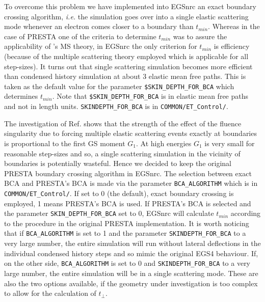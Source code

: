 To overcome this problem we have implemented into EGSnrc an 
exact boundary crossing algorithm, {\em i.e.} the simulation 
goes over into a single elastic scattering mode whenever 
an electron comes closer to a 
boundary than $t_{min}$. 
Whereas in the case of PRESTA one of 
the criteria to determine $t_{min}$ was to assure the 
applicability of \Mol's MS theory, in EGSnrc the only criterion 
for $t_{min}$ is efficiency (because of the multiple scattering theory 
employed which is applicable for all step-sizes). It turns out that single 
scattering simulation becomes more efficient than condensed history
simulation at about 
3 elastic mean free paths. This is taken as the default value 
for the parameter {\tt \$SKIN\_DEPTH\_FOR\_BCA} which determines 
$t_{min}$. Note that {\tt \$SKIN\_DEPTH\_FOR\_BCA} is in 
elastic mean free paths and not in length units.  
{\tt SKINDEPTH\_FOR\_BCA} is in {\tt COMMON/ET\_Control/}.

 
The investigation of Ref. \cite{Ka99b} shows that the 
strength of the effect of the fluence singularity 
due to forcing multiple elastic scattering events exactly 
at boundaries is proportional to the first GS moment $G_1$. 
At high energies $G_1$ is very small for reasonable step-sizes and 
so, a single scattering simulation in the vicinity of 
boundaries is potentially wasteful. Hence we decided to keep 
the original PRESTA boundary crossing algorithm in EGSnrc. The selection 
between exact BCA and PRESTA's BCA is made via the parameter 
{\tt BCA\_ALGORITHM} which is in {\tt COMMON/ET\_Control/}.
If set to 0 (the default), exact boundary crossing is employed, 
1 means PRESTA's BCA is used. If PRESTA's BCA is selected 
and the parameter {\tt SKIN\_DEPTH\_FOR\_BCA} set to 0, 
EGSnrc will calculate $t_{min}$ according to the procedure 
in the original PRESTA implementation. It is worth noticing 
that if {\tt BCA\_ALGORITHM} is set to 1 and the parameter 
{\tt SKINDEPTH\_FOR\_BCA} to a very large number, 
the entire simulation will run without lateral deflections 
in the individual condensed history steps and so 
mimic the original EGS4 behaviour. If, on the other side, 
{\tt BCA\_ALGORITHM} is set to 0 and {\tt SKINDEPTH\_FOR\_BCA} 
to a very large number, the entire simulation will be in 
a single scattering mode. These are also the two options 
available, if the geometry under investigation is 
too complex to allow for the calculation of $t_\perp$. 

